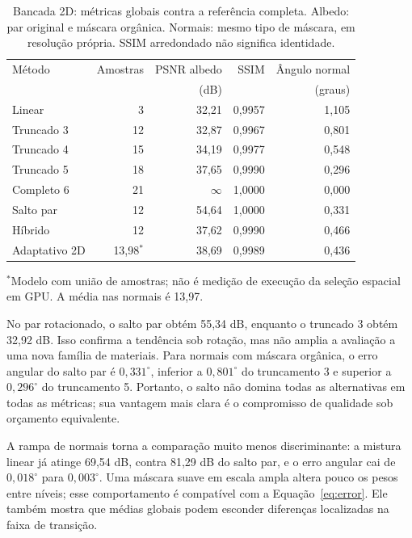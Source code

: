 \begin{table}[t]
\centering\scriptsize\setlength{\tabcolsep}{3.2pt}
\caption{Bancada 2D: métricas globais contra a referência completa. Albedo: par original e máscara orgânica. Normais: mesmo tipo de máscara, em resolução própria. SSIM arredondado não significa identidade.}
\label{tab:2d}
\begin{tabular}{lrrrr}\toprule
Método & Amostras & PSNR albedo & SSIM & Ângulo normal\\
 & & (dB) & & (graus)\\\midrule
Linear & 3 & 32,21 & 0,9957 & 1,105\\
Truncado 3 & 12 & 32,87 & 0,9967 & 0,801\\
Truncado 4 & 15 & 34,19 & 0,9977 & 0,548\\
Truncado 5 & 18 & 37,65 & 0,9990 & 0,296\\
Completo 6 & 21 & $\infty$ & 1,0000 & 0,000\\
Salto par & 12 & 54,64 & 1,0000 & 0,331\\
Híbrido & 12 & 37,62 & 0,9990 & 0,466\\
Adaptativo 2D & 13,98$^*$ & 38,69 & 0,9989 & 0,436\\\bottomrule
\end{tabular}
\par\vspace{2pt}\raggedright\scriptsize $^*$Modelo com união de amostras; não é medição de execução da seleção espacial em GPU. A média nas normais é 13,97.
\end{table}

No par rotacionado, o salto par obtém 55,34 dB, enquanto o truncado 3 obtém 32,92 dB. Isso confirma a tendência sob rotação, mas não amplia a avaliação a uma nova família de materiais. Para normais com máscara orgânica, o erro angular do salto par é $0{,}331^\circ$, inferior a $0{,}801^\circ$ do truncamento 3 e superior a $0{,}296^\circ$ do truncamento 5. Portanto, o salto não domina todas as alternativas em todas as métricas; sua vantagem mais clara é o compromisso de qualidade sob orçamento equivalente.

A rampa de normais torna a comparação muito menos discriminante: a mistura linear já atinge 69,54 dB, contra 81,29 dB do salto par, e o erro angular cai de $0{,}018^\circ$ para $0{,}003^\circ$. Uma máscara suave em escala ampla altera pouco os pesos entre níveis; esse comportamento é compatível com a Equação~\ref{eq:error}. Ele também mostra que médias globais podem esconder diferenças localizadas na faixa de transição.

